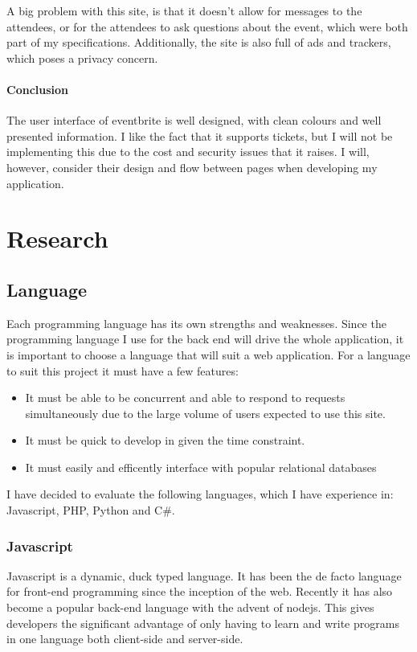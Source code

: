 \documentclass[a4paper,oneside,12pt,draft]{report}
\begin{document}
	A big problem with this site, is that it doesn't allow for messages to the attendees, or for the attendees to ask questions about the event, which were both part of my specifications. Additionally, the site is also full of ads and trackers, which poses a privacy concern.

	\subsubsection{Conclusion}
	The user interface of eventbrite is well designed, with clean colours and well presented information. I like the fact that it supports tickets, but I will not be implementing this due to the cost and security issues that it raises. I will, however, consider their design and flow between pages when developing my application.


	\chapter{Research}

	\section{Language}
	Each programming language has its own strengths and weaknesses. Since the programming language I use for the back end will drive the whole application, it is important to choose a language that will suit a web application. For a language to suit this project it must have a few features:

	\begin{itemize}
		\item It must be able to be concurrent and able to respond to requests simultaneously due to the large volume of users expected to use this site.
		\item It must be quick to develop in given the time constraint.
		\item It must easily and efficently interface with popular relational databases
	\end{itemize}

	I have decided to evaluate the following languages, which I have experience in: Javascript, PHP, Python and C\#.

	\subsection{Javascript}
	Javascript is a dynamic, duck typed language. It has been the de facto language for front-end programming since the inception of the web. Recently it has also become a popular back-end language with the advent of nodejs. This gives developers the significant advantage of only having to learn and write programs in one language both client-side and server-side.
\end{document}
